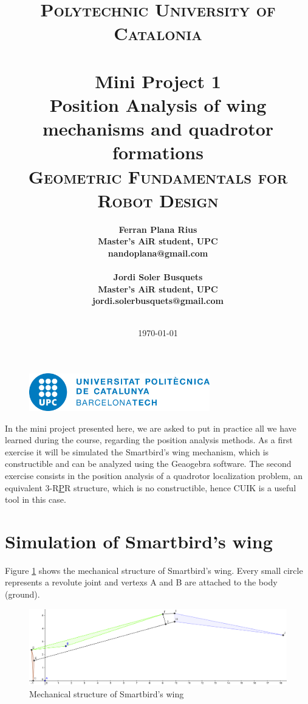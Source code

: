 \documentclass[paper=a4, fontsize=11pt]{scrartcl} %
\title{	\pagestyle{empty}
\normalfont \normalsize 
\textsc{Polytechnic University of Catalonia} \\ [25pt] %
\horrule{0.5pt} \\[0.4cm] %
\Huge \bf Mini Project 1 \\ %
\large Position Analysis of wing mechanisms and quadrotor formations
\horrule{2pt} \\[0.5cm] %
\textsc{Geometric Fundamentals for Robot Design} \\ [25pt]
}
\author{\bf{Ferran Plana Rius}\\ \small{Master's AiR student, UPC} \\ \small{nandoplana@gmail.com} \\ \\
\bf{Jordi Soler Busquets}\\ \small{Master's AiR student, UPC} \\ \small{jordi.solerbusquets@gmail.com} \\ \\}
\date{\large\today}
\renewcommand{\footrulewidth}{0pt} %
\begin{document}

\pagestyle{empty}
\maketitle %
\begin{figure}[b]
  \centering
     \includegraphics[width=0.7\textwidth]{UPC-logo.png}
\end{figure}
\thispagestyle{empty}
\newpage
\pagestyle{fancyplain}
\renewcommand\footrulewidth{0.1pt} %


In the mini project presented here, we are asked to put in practice all we have learned during the course, regarding the position analysis methods. As a first exercise it will be simulated the Smartbird's wing mechanism, which is constructible and can be analyzed using the Geaogebra software. The second exercise consists in the position analysis of a quadrotor localization problem, an equivalent 3-R\underline{P}R structure, which is no constructible, hence CUIK is a useful tool in this case.

\section{Simulation of Smartbird's wing}
Figure \ref{fig:wing} shows the mechanical structure of Smartbird's wing. Every small circle represents a revolute joint and vertexs A and B are attached to the body (ground).\\
	
\begin{figure}[htb]
	\begin{center}
		\includegraphics[width=0.75\linewidth]{wing.PNG} 
	\caption{Mechanical structure of Smartbird's wing}
	\label{fig:wing}
	\end{center}
\end{figure}
\end{document}
